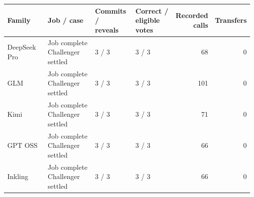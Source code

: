 \begin{tabular}{llllrr}
\toprule
Family & Job / case & \shortstack[l]{Commits /\\reveals} & \shortstack[l]{Correct /\\eligible votes} & \shortstack[r]{Recorded\\calls} & Transfers\\
\midrule
DeepSeek Pro & \shortstack[l]{Job complete\\Challenger settled} & 3 / 3 & 3 / 3 & 68 & 0\\
GLM & \shortstack[l]{Job complete\\Challenger settled} & 3 / 3 & 3 / 3 & 101 & 0\\
Kimi & \shortstack[l]{Job complete\\Challenger settled} & 3 / 3 & 3 / 3 & 71 & 0\\
GPT OSS & \shortstack[l]{Job complete\\Challenger settled} & 3 / 3 & 3 / 3 & 66 & 0\\
Inkling & \shortstack[l]{Job complete\\Challenger settled} & 3 / 3 & 3 / 3 & 66 & 0\\
\bottomrule
\end{tabular}
